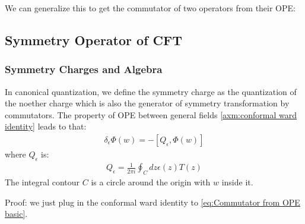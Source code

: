 We can generalize this to get the commutator of two operators from their OPE:

\subsection{Symmetry Operator of CFT}

\subsubsection{Symmetry Charges and Algebra}

In canonical quantization, we define the symmetry charge as the
quantization of the noether charge which is also the generator of
symmetry transformation by commutators. The property of OPE between
general fields \cref{axm:conformal ward identity} leads to that:
\begin{align}
  \delta_\epsilon\Phi(w)=-[Q_\epsilon,\Phi(w)]
\end{align}
where $ Q_\epsilon $ is:
\begin{align}
  Q_\epsilon=\frac{1}{2\pi i}\oint_C dz\epsilon(z)T(z)
\end{align}
The integral contour $ C $ is a circle around the origin with $ w $ inside it.

Proof: we just plug in the conformal ward identity to
\cref{eq:Commutator from OPE basic}.

